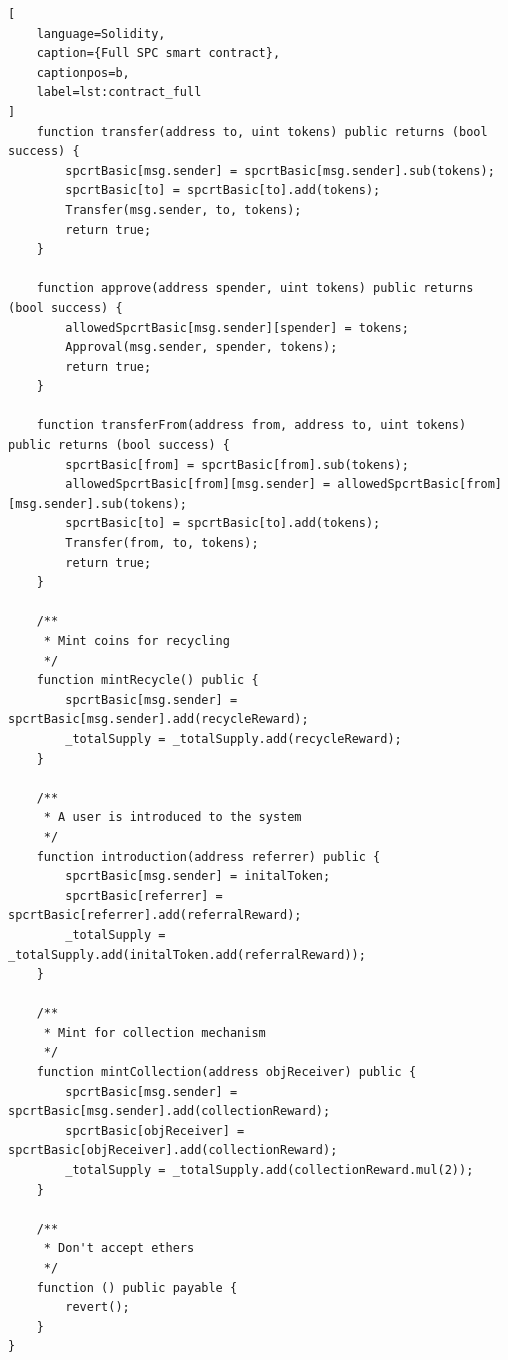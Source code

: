 \documentclass[11pt]{scrartcl}
\begin{document}
\begin{lstlisting}[
    language=Solidity,
    caption={Full SPC smart contract},
    captionpos=b,
    label=lst:contract_full
]
    function transfer(address to, uint tokens) public returns (bool success) {
        spcrtBasic[msg.sender] = spcrtBasic[msg.sender].sub(tokens);
        spcrtBasic[to] = spcrtBasic[to].add(tokens);
        Transfer(msg.sender, to, tokens);
        return true;
    }

    function approve(address spender, uint tokens) public returns (bool success) {
        allowedSpcrtBasic[msg.sender][spender] = tokens;
        Approval(msg.sender, spender, tokens);
        return true;
    }

    function transferFrom(address from, address to, uint tokens) public returns (bool success) {
        spcrtBasic[from] = spcrtBasic[from].sub(tokens);
        allowedSpcrtBasic[from][msg.sender] = allowedSpcrtBasic[from][msg.sender].sub(tokens);
        spcrtBasic[to] = spcrtBasic[to].add(tokens);
        Transfer(from, to, tokens);
        return true;
    }

    /**
     * Mint coins for recycling
     */
    function mintRecycle() public {
        spcrtBasic[msg.sender] = spcrtBasic[msg.sender].add(recycleReward);
		_totalSupply = _totalSupply.add(recycleReward);
    }

    /**
     * A user is introduced to the system
     */
    function introduction(address referrer) public {
        spcrtBasic[msg.sender] = initalToken;
		spcrtBasic[referrer] = spcrtBasic[referrer].add(referralReward);
		_totalSupply = _totalSupply.add(initalToken.add(referralReward));
	}

    /**
     * Mint for collection mechanism
     */
    function mintCollection(address objReceiver) public {
        spcrtBasic[msg.sender] = spcrtBasic[msg.sender].add(collectionReward);
        spcrtBasic[objReceiver] = spcrtBasic[objReceiver].add(collectionReward);
        _totalSupply = _totalSupply.add(collectionReward.mul(2));
    }

    /**
     * Don't accept ethers
     */
    function () public payable {
        revert();
    }
}
\end{lstlisting}
\end{document}
